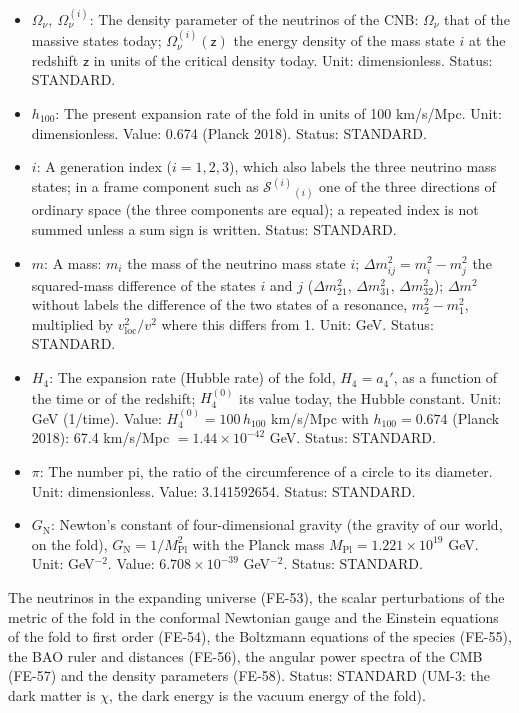 \documentclass[
  10pt,
]{article}
\begin{document}
\begin{itemize}
\item
  \(\Omega_\nu,\ \Omega_\nu^{(i)}\): The density parameter of the
  neutrinos of the CNB: \(\Omega_\nu\) that of the massive states today;
  \(\Omega_\nu^{(i)}(\mathsf{z})\) the energy density of the mass state
  \(i\) at the redshift \(\mathsf{z}\) in units of the critical density
  today. Unit: dimensionless. Status: STANDARD.
\item
  \(h_{100}\): The present expansion rate of the fold in units of 100
  km/s/Mpc. Unit: dimensionless. Value: 0.674 (Planck 2018). Status:
  STANDARD.
\item
  \(i\): A generation index (\(i = 1, 2, 3\)), which also labels the
  three neutrino mass states; in a frame component such as
  \(\mathcal{S}^{(i)}{}_{(i)}\) one of the three directions of ordinary
  space (the three components are equal); a repeated index is not summed
  unless a sum sign is written. Status: STANDARD.
\item
  \(m\): A mass: \(m_i\) the mass of the neutrino mass state \(i\);
  \(\Delta m_{ij}^2 = m_i^2 - m_j^2\) the squared-mass difference of the
  states \(i\) and \(j\) (\(\Delta m_{21}^2\), \(\Delta m_{31}^2\),
  \(\Delta m_{32}^2\)); \(\Delta m^2\) without labels the difference of
  the two states of a resonance, \(m_2^2 - m_1^2\), multiplied by
  \(v_{\mathrm{loc}}^2/v^2\) where this differs from 1. Unit: GeV.
  Status: STANDARD.
\item
  \(H_4\): The expansion rate (Hubble rate) of the fold, \(H_4 = a_4'\),
  as a function of the time or of the redshift; \(H_4^{(0)}\) its value
  today, the Hubble constant. Unit: GeV (1/time). Value:
  \(H_4^{(0)} = 100\,h_{100}\) km/s/Mpc with \(h_{100} = 0.674\) (Planck
  2018): 67.4 km/s/Mpc \(= 1.44\times10^{-42}\) GeV. Status: STANDARD.
\item
  \(\pi\): The number pi, the ratio of the circumference of a circle to
  its diameter. Unit: dimensionless. Value: 3.141592654. Status:
  STANDARD.
\item
  \(G_{\mathrm{N}}\): Newton's constant of four-dimensional gravity (the
  gravity of our world, on the fold),
  \(G_{\mathrm{N}} = 1/M_{\mathrm{Pl}}^2\) with the Planck mass
  \(M_{\mathrm{Pl}} = 1.221\times10^{19}\) GeV. Unit: GeV\(^{-2}\).
  Value: \(6.708\times10^{-39}\) GeV\(^{-2}\). Status: STANDARD.
\end{itemize}

The neutrinos in the expanding universe (FE-53), the scalar
perturbations of the metric of the fold in the conformal Newtonian gauge
and the Einstein equations of the fold to first order (FE-54), the
Boltzmann equations of the species (FE-55), the BAO ruler and distances
(FE-56), the angular power spectra of the CMB (FE-57) and the density
parameters (FE-58). Status: STANDARD (UM-3: the dark matter is \(\chi\),
the dark energy is the vacuum energy of the fold).
\end{document}
